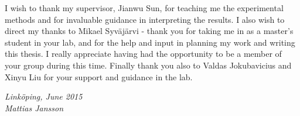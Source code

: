 \begin{acknowledgments}
  I wish to thank my supervisor, Jianwu Sun, for teaching me the experimental methods and for invaluable guidance in interpreting the results. I also wish to direct my thanks to Mikael Syväjärvi - thank you for taking me in as a master's student in your lab, and for the help and input in planning my work and writing this thesis. I really appreciate having had the opportunity to be a member of your group during this time. Finally thank you also to Valdas Jokubavicius and Xinyu Liu for your support and guidance in the lab. 

  \addvspace{1em}
  \begin{flushright}
    \textit{%
      Linköping, June 2015\\
      Mattias Jansson%
    }
  \end{flushright}
\end{acknowledgments}
